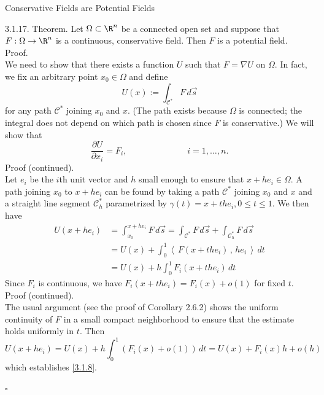 \documentclass[smaller,hyperref={CJKbookmarks=true}]{beamer}
\newcommand{\scp}[2]{\left\langle\,#1\,,\,#2\,\right\rangle} \newcommand{\scpp}{\langle\,\cdot\,,\,\cdot\,\rangle}
\begin{document}
\begin{frame}{Conservative Fields are Potential Fields}
\begin{spacing}{1}
\vspace*{14pt}
\alert{3.1.17. Theorem.} Let $\Omega\subset\R^n$ be a connected open set and suppose that $F:\Omega\to\R^n$ is a continuous, conservative field. Then $F$ is a potential field.\\[7pt]
\alert{Proof.}\\
We need to show that there exists a function $U$ such that $F=\nabla U$ on $\Omega$. In fact, we fix an arbitrary point $x_0\in\Omega$ and define
\[U(x):=\int_{\mathcal{C}^*}F\,d\vec{s}\]
for any path $\mathcal{C}^*$ joining $x_0$ and $x$. (The path exists because $\Omega$ is connected; the integral does not depend on which path is chosen since $F$ is conservative.) We will show that
\begin{equation}\label{3.1.8}
  \frac{\partial U}{\partial x_i}=F_i,\qquad\qquad\qquad\quad
  i=1,\ldots,n.
\end{equation}
\newpage
\vspace*{10pt}
\alert{Proof (continued).}\\
Let $e_i$ be the $i$th unit vector and $h$ small enough to ensure that $x+he_i\in\Omega$. A path joining $x_0$ to $x+he_i$ can be found by taking a path $\mathcal{C}^*$ joining $x_0$ and $x$ and a straight line segment $\mathcal{C}_h^*$ parametrized by $\gamma(t)=x+the_i,0\leq t\leq 1$. We then have
\begin{equation*}
  \begin{split}
     U(x+he_i) &=\int_{x_0}^{x+he_i}F\,d\vec{s}
     =\int_{\mathcal{C}^*}F\,d\vec{s}
     +\int_{\mathcal{C}_h^*}F\,d\vec{s} \\
       &=U(x)+\int_{0}^{1}\scp{F(x+the_i)}{he_i}\,dt \\
       &=U(x)+h\int_{0}^{1}F_i(x+the_i)\,dt
  \end{split}
\end{equation*}
Since $F_i$ is continuous, we have $F_i(x+the_i)=F_i(x)+o(1)$ for fixed $t$.
\newpage
\alert{Proof (continued).}\\
The usual argument (see the proof of Corollary 2.6.2) shows the uniform
continuity of $F$ in a small compact neighborhood to ensure that the
estimate holds uniformly in $t$. Then
\[U(x+he_i)=U(x)+h\int_{0}^{1}(F_i(x)+o(1))\,dt
=U(x)+F_i(x)h+o(h)\]
which establishes \eqref{3.1.8}.
\begin{flushright}
  $\square$
\end{flushright}
\end{spacing}
\end{frame}
\end{document}
